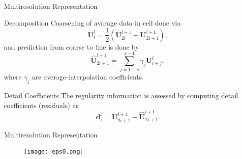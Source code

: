\documentclass{beamer}
\begin{document}
\begin{frame}{Multiresolution Representation}
\begin{figure}
    \end{figure}

\end{frame}

\begin{frame}{Decomposition}
    Coarsening of avarage data in cell done via
    \begin{equation*}
        \mathbf{U}^{l}_{i} = \frac{1}{2} \left( \mathbf{U}^{l+1}_{2i} +
        \mathbf{U}^{l+1}_{2i+1} \right),
    \end{equation*}
    and prediction from coarse to fine is done by
    \begin{equation*}
        \mathbf{\hat{U}}^{l+1}_{2i+1} = \sum_{j=1-s}^{s-1} \gamma_{j}
        \mathbf{U}^{l}_{i+j},
    \end{equation*}
    where $\gamma_{j}$ are average-interpolation coefficients.
\end{frame}

\begin{frame}[shrink=25]{Detail Coefficients}
    The regularity information is assessed by computing detail coefficients
    (residuals) as
    \begin{equation*}
        \mathbf{d}^{l}_{i} = \mathbf{U}^{l+1}_{2i+1} - \mathbf{\hat{U}}^{l+1}_{2i+1}.
    \end{equation*}
    \begin{figure}
        \center
        
    \end{figure}
\end{frame}

\begin{frame}{Multiresolution Representation}
    \begin{figure}
        \center
        \texttt{[image: eps0.png]}
    \end{figure}
\end{frame}
\end{document}
